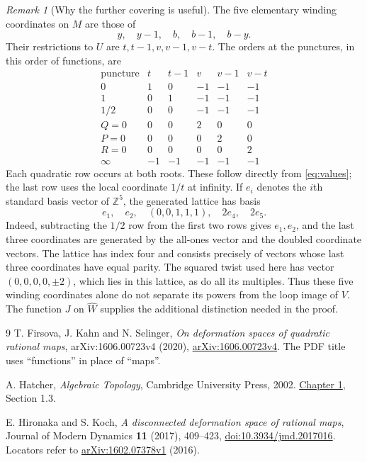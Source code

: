 \documentclass[11pt]{article}
\newcommand{\Z}{\mathbb Z}
\theoremstyle{remark}
\newtheorem{remark}[theorem]{Remark}
\begin{document}
\begin{remark}[Why the further covering is useful]\label{rem:lattice}
The five elementary winding coordinates on $M$ are those of
\[
 y,\quad y-1,\quad b,\quad b-1,\quad b-y.
\]
Their restrictions to $U$ are $t,t-1,v,v-1,v-t$. The orders at the punctures, in this order of functions, are
\[
\begin{array}{c|rrrrr}
\text{puncture}&t&t-1&v&v-1&v-t\\ \hline
0&1&0&-1&-1&-1\\
1&0&1&-1&-1&-1\\
1/2&0&0&-1&-1&-1\\
Q=0&0&0&2&0&0\\
P=0&0&0&0&2&0\\
R=0&0&0&0&0&2\\
\infty&-1&-1&-1&-1&-1
\end{array}
\]
Each quadratic row occurs at both roots. These follow directly from \eqref{eq:values}; the last row uses the local coordinate $1/t$ at infinity. If $e_i$ denotes the $i$th standard basis vector of $\Z^5$, the generated lattice has basis
\[
 e_1,\quad e_2,\quad (0,0,1,1,1),\quad 2e_4,\quad 2e_5.
\]
Indeed, subtracting the $1/2$ row from the first two rows gives $e_1,e_2$, and the last three coordinates are generated by the all-ones vector and the doubled coordinate vectors. The lattice has index four and consists precisely of vectors whose last three coordinates have equal parity. The squared twist used here has vector $(0,0,0,0,\pm2)$, which lies in this lattice, as do all its multiples. Thus these five winding coordinates alone do not separate its powers from the loop image of $V$. The function $J$ on $\widehat W$ supplies the additional distinction needed in the proof.
\end{remark}

\begin{thebibliography}{9}
T. Firsova, J. Kahn and N. Selinger,
\emph{On deformation spaces of quadratic rational maps},
arXiv:1606.00723v4 (2020),
\href{https://arxiv.org/abs/1606.00723v4}{arXiv:1606.00723v4}.
The PDF title uses ``functions'' in place of ``maps''.

A. Hatcher, \emph{Algebraic Topology}, Cambridge University Press, 2002.
\href{https://pi.math.cornell.edu/~hatcher/AT/ATch1.pdf}{Chapter 1}, Section 1.3.

E. Hironaka and S. Koch,
\emph{A disconnected deformation space of rational maps},
Journal of Modern Dynamics \textbf{11} (2017), 409--423,
\href{https://doi.org/10.3934/jmd.2017016}{doi:10.3934/jmd.2017016}.
Locators refer to \href{https://arxiv.org/abs/1602.07378v1}{arXiv:1602.07378v1} (2016).
\end{thebibliography}
\end{document}
